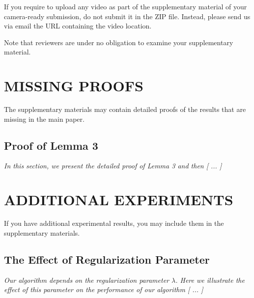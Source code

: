 If you require to upload any video as part of the supplementary material of your camera-ready submission, do not submit it in the ZIP file. Instead, please send us via email the URL containing the video location.

Note that reviewers are under no obligation to examine your supplementary material.

\section{MISSING PROOFS}

The supplementary materials may contain detailed proofs of the results that are missing in the main paper.

\subsection{Proof of Lemma 3}

\textit{In this section, we present the detailed proof of Lemma 3 and then [ ... ]}

\section{ADDITIONAL EXPERIMENTS}

If you have additional experimental results, you may include them in the supplementary materials.

\subsection{The Effect of Regularization Parameter}

\textit{Our algorithm depends on the regularization parameter $\lambda$. Here we illustrate the effect of this parameter on the performance of our algorithm [ ... ]}


